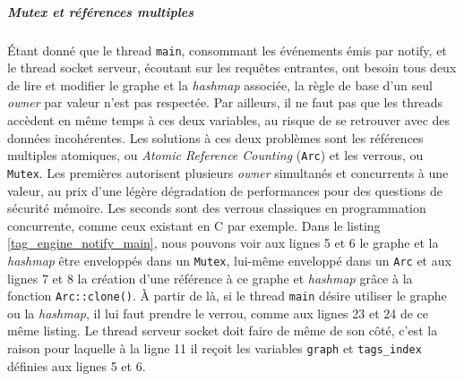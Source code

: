 \subparagraph{Mutex et références multiples}
Étant donné que le thread \texttt{main}, consommant les événements émis par notify, et le 
thread socket serveur, écoutant sur les requêtes entrantes, ont besoin tous deux de lire et modifier 
le graphe et la \textit{hashmap} associée, la règle de base d'un seul \textit{owner} par valeur 
n'est pas respectée. Par ailleurs, il ne faut pas que les threads accèdent en même temps à ces 
deux variables, au risque de se retrouver avec des données incohérentes. Les solutions à ces deux 
problèmes sont les références multiples atomiques, ou \textit{Atomic Reference Counting} (\texttt{Arc}) 
et les verrous, ou \texttt{Mutex}. Les premières autorisent plusieurs \textit{owner} 
simultanés et concurrents à une valeur, au prix d'une légère dégradation de performances pour 
des questions de sécurité mémoire. Les seconds sont des verrous classiques en programmation 
concurrente, comme ceux existant en C par exemple. Dans le listing \ref{tag_engine_notify_main}, 
nous pouvons voir aux lignes 5 et 6 le graphe et la \textit{hashmap} être enveloppés dans un 
\texttt{Mutex}, lui-même enveloppé dans un \texttt{Arc} et aux lignes 7 et 8 
la création d'une référence à ce graphe et \textit{hashmap} grâce à la fonction 
\texttt{Arc::clone()}. À partir de là, si le thread \texttt{main} désire utiliser 
le graphe ou la \textit{hashmap}, il lui faut prendre le verrou, comme aux lignes 23 et 24 de ce même listing.
Le thread serveur socket doit faire de même de son côté, c'est la raison pour laquelle à la ligne 11 
il reçoit les variables \texttt{graph} et \texttt{tags_index} définies aux lignes 5 et 6.
\bigbreak
